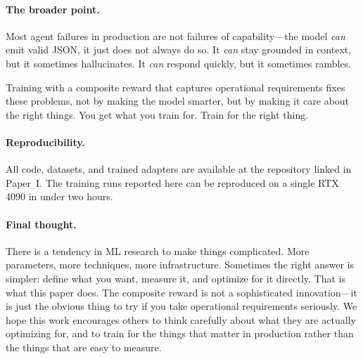 \documentclass[11pt]{article}
\begin{document}
\paragraph{The broader point.}
Most agent failures in production are not failures of capability---the model \emph{can} emit valid JSON, it just does not always do so.
It \emph{can} stay grounded in context, but it sometimes hallucinates.
It \emph{can} respond quickly, but it sometimes rambles.

Training with a composite reward that captures operational requirements fixes these problems, not by making the model smarter, but by making it care about the right things.
You get what you train for.
Train for the right thing.

\paragraph{Reproducibility.}
All code, datasets, and trained adapters are available at the repository linked in Paper~I.
The training runs reported here can be reproduced on a single RTX 4090 in under two hours.

\paragraph{Final thought.}
There is a tendency in ML research to make things complicated.
More parameters, more techniques, more infrastructure.
Sometimes the right answer is simpler: define what you want, measure it, and optimize for it directly.
That is what this paper does.
The composite reward is not a sophisticated innovation---it is just the obvious thing to try if you take operational requirements seriously.
We hope this work encourages others to think carefully about what they are actually optimizing for, and to train for the things that matter in production rather than the things that are easy to measure.



\end{document}
